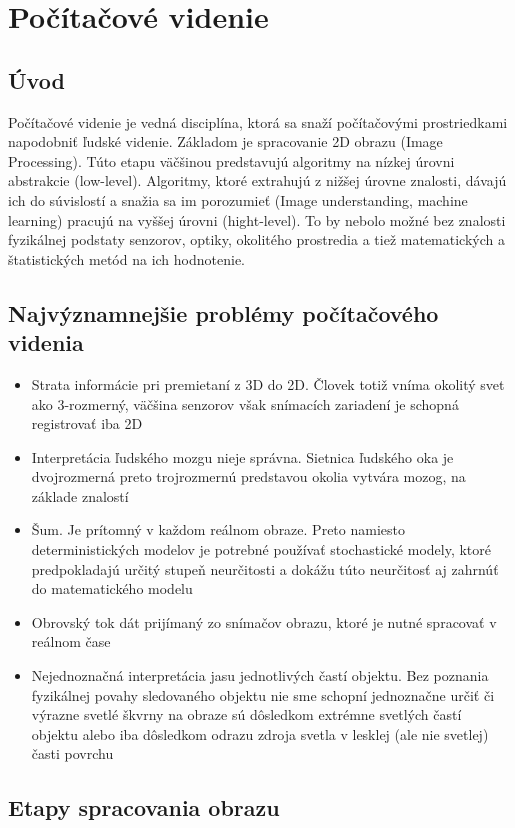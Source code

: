 \chapter{Počítačové videnie}
\section{Úvod}
Počítačové videnie je vedná disciplína, ktorá sa snaží počítačovými prostriedkami napodobniť ľudské videnie. Základom je spracovanie 2D obrazu (Image Processing). Túto etapu väčšinou predstavujú algoritmy na nízkej úrovni abstrakcie (low-level). Algoritmy, ktoré extrahujú z nižšej úrovne znalosti, dávajú ich do súvislostí a snažia sa im porozumieť (Image understanding, machine learning) pracujú na vyššej úrovni (hight-level). To by nebolo možné bez znalosti fyzikálnej podstaty senzorov, optiky, okolitého prostredia a tiež matematických a štatistických metód na ich hodnotenie.

\section{Najvýznamnejšie problémy počítačového videnia}
\begin{itemize}
\item Strata informácie pri premietaní z 3D do 2D. Človek totiž vníma okolitý svet ako 3-rozmerný, väčšina senzorov však snímacích zariadení je schopná registrovať iba 2D
\item Interpretácia ľudského mozgu nieje správna. Sietnica ľudského oka je dvojrozmerná preto trojrozmernú predstavou okolia vytvára mozog, na základe znalostí
\item Šum. Je prítomný v každom reálnom obraze. Preto namiesto deterministických modelov je potrebné používať stochastické modely, ktoré predpokladajú určitý stupeň neurčitosti a dokážu túto neurčitosť aj zahrnúť do matematického modelu
\item Obrovský tok dát prijímaný zo snímačov obrazu, ktoré je nutné spracovať v reálnom čase
\item Nejednoznačná interpretácia jasu jednotlivých častí objektu. Bez poznania fyzikálnej povahy sledovaného objektu nie sme schopní jednoznačne určiť či výrazne svetlé škvrny na obraze sú dôsledkom extrémne svetlých častí objektu alebo iba dôsledkom odrazu zdroja svetla v lesklej (ale nie svetlej) časti povrchu
\end{itemize}


\section{Etapy spracovania obrazu}


